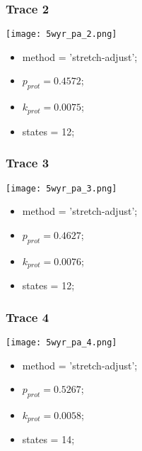 \subsubsection{Trace 2}
\begin{minipage}[c]{0.7\textwidth}
    \texttt{[image: 5wyr\_pa\_2.png]}
\end{minipage}
\hfill
\begin{minipage}[c]{0.45\textwidth}
    \begin{itemize}
        \item method = 'stretch-adjust';
        \item $p_{prot}=0.4572$;
        \item $k_{prot}=0.0075$;
        \item states = 12;
    \end{itemize}
\end{minipage}

\subsubsection{Trace 3}
\begin{minipage}[c]{0.7\textwidth}
    \texttt{[image: 5wyr\_pa\_3.png]}
\end{minipage}
\hfill
\begin{minipage}[c]{0.45\textwidth}
    \begin{itemize}
        \item method = 'stretch-adjust';
        \item $p_{prot}=0.4627$;
        \item $k_{prot}=0.0076$;
        \item states = 12;
    \end{itemize}
\end{minipage}

\subsubsection{Trace 4}
\begin{minipage}[c]{0.7\textwidth}
    \texttt{[image: 5wyr\_pa\_4.png]}
\end{minipage}
\hfill
\begin{minipage}[c]{0.45\textwidth}
    \begin{itemize}
        \item method = 'stretch-adjust';
        \item $p_{prot}=0.5267$;
        \item $k_{prot}=0.0058$;
        \item states = 14;
    \end{itemize}
\end{minipage}


